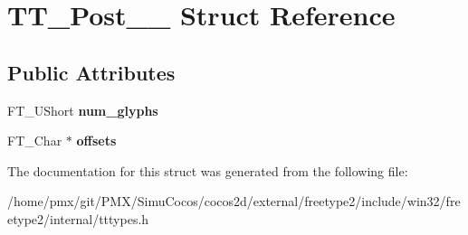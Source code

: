 \hypertarget{structTT__Post__25__}{}\section{T\+T\+\_\+\+Post\+\_\+\_\+ Struct Reference}
\label{structTT__Post__25__}
\subsection*{Public Attributes}
\begin{DoxyCompactItemize}
\item 
\mbox{\label{structTT__Post__25___aae397ce6206c910ecc13f8b46bace595}} 
F\+T\+\_\+\+U\+Short {\bfseries num\+\_\+glyphs}
\item 
\mbox{\label{structTT__Post__25___a7ec4e0ffc2592e6666685e170ae3ad87}} 
F\+T\+\_\+\+Char $\ast$ {\bfseries offsets}
\end{DoxyCompactItemize}


The documentation for this struct was generated from the following file\+:\begin{DoxyCompactItemize}
\item 
/home/pmx/git/\+P\+M\+X/\+Simu\+Cocos/cocos2d/external/freetype2/include/win32/freetype2/internal/tttypes.\+h\end{DoxyCompactItemize}
